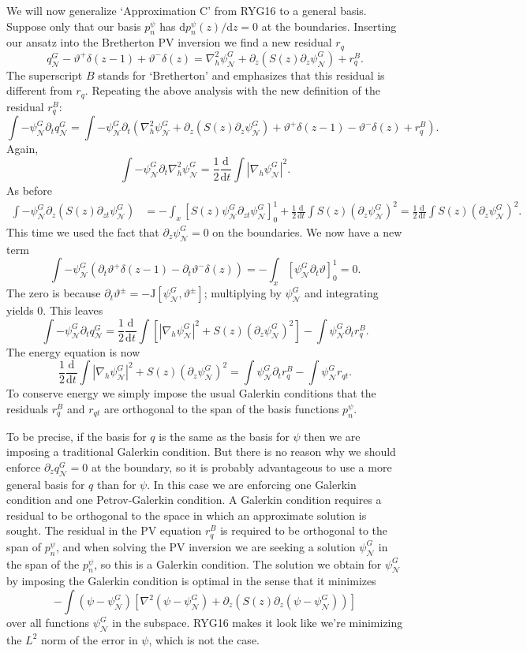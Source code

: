 \documentclass[10pt]{article}
\newcommand{\pd}[1]{\partial_{#1}}
\newcommand{\dd}[3]{\frac{\text{d}^{#3}#1}{\text{d}#2^{#3}}}
\newcommand{\tJ}{\text{J}}
\newcommand{\sN}{\mathcal{N}}
\begin{document}
We will now generalize `Approximation C' from RYG16 to a general basis.
Suppose only that our basis $p_n^\psi$ has d$p_n^\psi(z)/$d$z = 0$ at the boundaries.
Inserting our ansatz into the Bretherton PV inversion we find a new residual $r_q$
\begin{equation}
q_\sN^G -\vartheta^+\delta(z-1) + \vartheta^-\delta(z) = \nabla_h^2\psi_\sN^G + \pd{z}\left(S(z)\pd{z}\psi_\sN^G\right) + r_q^B.
\end{equation}
The superscript $B$ stands for `Bretherton' and emphasizes that this residual is different from $r_q$.
Repeating the above analysis with the new definition of the residual $r_q^B$:
\[\int -\psi_\sN^G\pd{t}q_\sN^G = \int -\psi_\sN^G\pd{t}\left(\nabla_h^2\psi_\sN^G + \pd{z}\left(S(z)\pd{z}\psi_\sN^G\right)+\vartheta^+\delta(z-1)-\vartheta^-\delta(z)+r_q^B\right).\]
Again, 
\[\int -\psi_\sN^G\pd{t}\nabla_h^2\psi_\sN^G = \frac{1}{2}\dd{}{t}{}\int|\nabla_h\psi_\sN^G|^2.\]
As before
\begin{align}
\int-\psi_\sN^G\pd{z}\left(S(z)\pd{zt}\psi_\sN^G\right) &= -\int_x\left[S(z)\psi_\sN^G\pd{zt}\psi_\sN^G\right]_0^1 + \frac{1}{2}\dd{}{t}{}\int S(z)\left(\pd{z}\psi_\sN^G\right)^2=\frac{1}{2}\dd{}{t}{}\int S(z)\left(\pd{z}\psi_\sN^G\right)^2.
\end{align}
This time we used the fact that $\pd{z}\psi_\sN^G = 0$ on the boundaries.
We now have a new term
\[\int-\psi_\sN^G(\pd{t}\vartheta^+\delta(z-1)-\pd{t}\vartheta^-\delta(z)) = -\int_x[\psi_\sN^G\pd{t}\vartheta]_0^1 = 0.\]
The zero is because $\pd{t}\vartheta^\pm = -\tJ[\psi_\sN^G,\vartheta^\pm]$; multiplying by $\psi_\sN^G$ and integrating yields 0.
This leaves
\[\int -\psi_\sN^G\pd{t}q_\sN^G= \frac{1}{2}\dd{}{t}{}\int \left[|\nabla_h\psi_\sN^G|^2 + S(z)\left(\pd{z}\psi_\sN^G\right)^2\right] - \int\psi_\sN^G\pd{t}r_q^B.\]
The energy equation is now
\[\frac{1}{2}\dd{}{t}{}\int |\nabla_h\psi_\sN^G|^2 + S(z)\left(\pd{z}\psi_\sN^G\right)^2 = \int\psi_\sN^G\pd{t}r_q^B-\int\psi_\sN^Gr_{qt}.\]
To conserve energy we simply impose the usual Galerkin conditions that the residuals $r_q^B$ and $r_{qt}$ are orthogonal to the span of the basis functions $p_n^\psi$.

To be precise, if the basis for $q$ is the same as the basis for $\psi$ then we are imposing a traditional Galerkin condition.
But there is no reason why we should enforce $\pd{z}q_\sN^G=0$ at the boundary, so it is probably advantageous to use a more general basis for $q$ than for $\psi$.
In this case we are enforcing one Galerkin condition and one Petrov-Galerkin condition.
A Galerkin condition requires a residual to be orthogonal to the space in which an approximate solution is sought.
The residual in the PV equation $r_q^B$ is required to be orthogonal to the span of $p_n^\psi$, and when solving the PV inversion we are seeking a solution $\psi_\sN^G$ in the span of the $p_n^\psi$, so this is a Galerkin condition.
The solution we obtain for $\psi_\sN^G$ by imposing the Galerkin condition is optimal in the sense that it minimizes
\[-\int(\psi-\psi_\sN^G)\left[\nabla^2(\psi-\psi_\sN^G) + \pd{z}\left(S(z)\pd{z}(\psi-\psi_\sN^G)\right)\right]\]
over all functions $\psi_\sN^G$ in the subspace.
RYG16 makes it look like we're minimizing the $L^2$ norm of the error in $\psi$, which is not the case.
\end{document}

